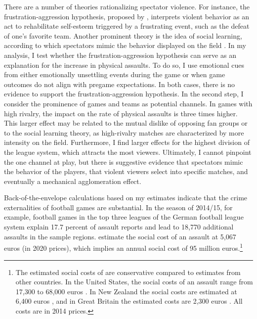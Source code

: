 There are a number of theories rationalizing spectator violence. For instance, the frustration-aggression hypothesis, proposed by \cite{dollard1939frustration}, interprets violent behavior as an act to rehabilitate self-esteem triggered by a frustrating event, such as the defeat of one's favorite team. Another prominent theory is the idea of social learning, according to which spectators mimic the behavior displayed on the field \citep{bandura1973aggression, bandura2007social}. In my analysis, I test whether the frustration-aggression hypothesis can serve as an explanation for the increase in physical assaults. To do so, I use emotional cues from either emotionally unsettling events during the game or when game outcomes do not align with pregame expectations. In both cases, there is no evidence to support the frustration-aggression hypothesis. In the second step, I consider the prominence of games and teams as potential channels. In games with high rivalry, the impact on the rate of physical assaults is three times higher. This larger effect may be related to the mutual dislike of opposing fan groups or to the social learning theory, as high-rivalry matches are characterized by more intensity on the field. Furthermore, I find larger effects for the highest division of the league system, which attracts the most viewers. Ultimately, I cannot pinpoint the one channel at play, but there is suggestive evidence that spectators mimic the behavior of the players, that violent viewers select into specific matches, and eventually a mechanical agglomeration effect. 



Back-of-the-envelope calculations based on my estimates indicate that the crime externalities of football games are substantial. In the season of 2014/15, for example, football games in the top three leagues of the German football league system explain 17.7 percent of assault reports and lead to 18,770 additional assaults in the sample regions. \cite{glaubitz2016kostet} estimate the social cost of an assault at 5,067 euros (in 2020 prices), which implies an annual social cost of 95 million euros.\footnote{The estimated social costs of \cite{glaubitz2016kostet} are conservative compared to estimates from other countries. In the United States, the social costs of an assault range from 17,300 to 68,000 euros \citep{miller1996victim,cohen2004willingness}. In New Zealand the social costs are estimated at 6,400 euros \citep{roper2006estimating}, and in Great Britain the estimated costs are 2,300 euros \citep{dubourg2005economic}. All costs are in 2014 prices.}




